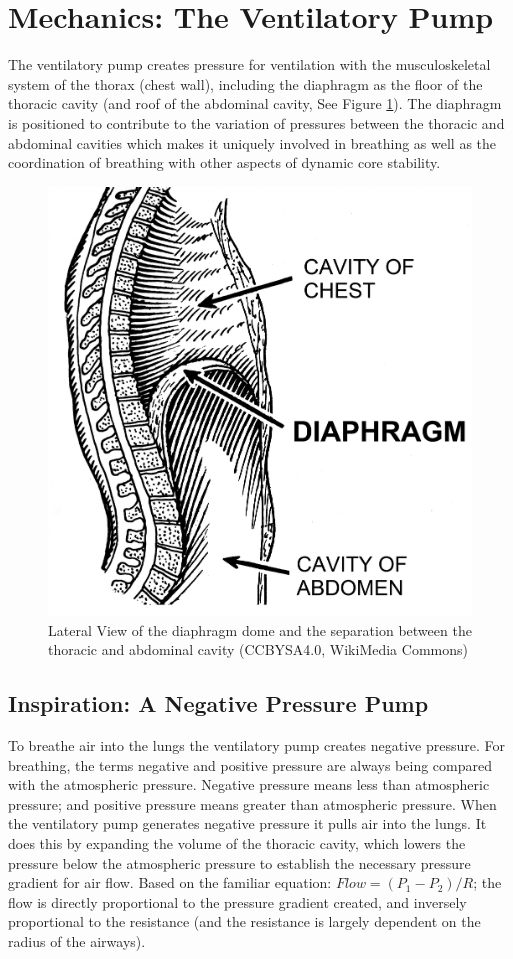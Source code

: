 \section{Mechanics: The Ventilatory Pump}

The ventilatory pump creates pressure for ventilation with the musculoskeletal system of the thorax (chest wall), including the diaphragm as the floor of the thoracic cavity (and roof of the abdominal cavity, See Figure \ref{fig:diaphragm_lateral}). The diaphragm is positioned to contribute to the variation of pressures between the thoracic and abdominal cavities which makes it uniquely involved in breathing as well as the coordination of breathing with other aspects of dynamic core stability. 

\begin{figure}[!h]
    \centering
    \includegraphics[width=0.35 \linewidth]{./figure/ventilation/diaphragm_lateral.png}
    \caption{Lateral View of the diaphragm dome and the separation between the thoracic and abdominal cavity \footnotesize{(CCBYSA4.0, WikiMedia Commons)}}
    \label{fig:diaphragm_lateral}
\end{figure}

\subsection{Inspiration: A Negative Pressure Pump} 
To breathe air into the lungs the ventilatory pump creates negative pressure. For breathing, the terms negative and positive pressure are always being compared with the atmospheric pressure. Negative pressure means less than atmospheric pressure; and positive pressure means greater than atmospheric pressure. When the ventilatory pump generates negative pressure it pulls air into the lungs. It does this by expanding the volume of the thoracic cavity, which lowers the pressure below the atmospheric pressure to establish the necessary pressure gradient for air flow. Based on the familiar equation: $Flow = (P_1 - P_2) / R$; the flow is directly proportional to the pressure gradient created, and inversely proportional to the resistance (and the resistance is largely dependent on the radius of the airways). 

